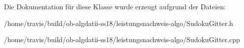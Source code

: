 Die Dokumentation für diese Klasse wurde erzeugt aufgrund der Dateien\-:\begin{DoxyCompactItemize}
\item 
/home/travis/build/ob-\/algdatii-\/ss18/leistungsnachweis-\/algo/Sudoku\-Gitter.\-h\item 
/home/travis/build/ob-\/algdatii-\/ss18/leistungsnachweis-\/algo/Sudoku\-Gitter.\-cpp\end{DoxyCompactItemize}
